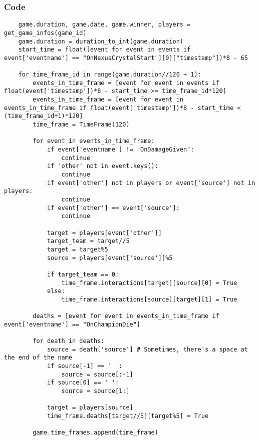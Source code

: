 \documentclass{beamer}
\begin{document}
\begin{frame}[fragile]
    \frametitle{Code}
    \fontsize{3pt}{5pt}\selectfont
    \begin{verbatim}
    game.duration, game.date, game.winner, players = get_game_infos(game_id)
    game.duration = duration_to_int(game.duration)
    start_time = float([event for event in events if event['eventname'] == "OnNexusCrystalStart"][0]["timestamp"])*8 - 65

    for time_frame_id in range(game.duration//120 + 1):
        events_in_time_frame = [event for event in events if float(event['timestamp'])*8 - start_time >= time_frame_id*120]
        events_in_time_frame = [event for event in events_in_time_frame if float(event['timestamp'])*8 - start_time < (time_frame_id+1)*120]
        time_frame = TimeFrame(120)

        for event in events_in_time_frame:
            if event['eventname'] != "OnDamageGiven":
                continue
            if 'other' not in event.keys():
                continue
            if event['other'] not in players or event['source'] not in players:
                continue
            if event['other'] == event['source']:
                continue
            
            target = players[event['other']]
            target_team = target//5
            target = target%5
            source = players[event['source']]%5

            if target_team == 0:
                time_frame.interactions[target][source][0] = True
            else:
                time_frame.interactions[source][target][1] = True

        deaths = [event for event in events_in_time_frame if event['eventname'] == "OnChampionDie"]
        
        for death in deaths:
            source = death['source'] # Sometimes, there's a space at the end of the name
            if source[-1] == ' ':
                source = source[:-1]
            if source[0] == ' ':
                source = source[1:]

            target = players[source]
            time_frame.deaths[target//5][target%5] = True

        game.time_frames.append(time_frame)
    \end{verbatim}
\end{frame}
\end{document}
